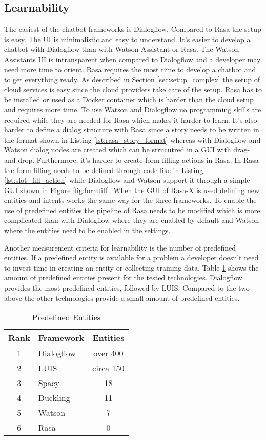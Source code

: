 \subsection*{Learnability}
The easiest of the chatbot frameworks is Dialogflow.
Compared to Rasa the setup is easy.
The UI is minimalistic and easy to understand.
It's easier to develop a chatbot with Dialogflow than with Watson Assistant or Rasa.
The Watson Assistants UI is intransparent when compared to Dialogflow and a developer 
may need more time to orient.
Rasa requires the most time to develop a chatbot and to get everything ready.
As described in Section \ref{sec:setup_complex} the setup of cloud services is 
easy since the cloud providers take care of the setup.
Rasa has to be installed or used as a Docker container which is harder than the cloud 
setup and requires more time.
To use Watson and Dialogflow no programming skills are required while they are needed for 
Rasa which makes it harder to learn.
It's also harder to define a dialog structure with Rasa since a story 
needs to be written in the format shown in Listing \ref{lst:rasa_story_format}
whereas with Dialogflow and Watson dialog nodes are created which 
can be strucutred in a GUI with drag-and-drop.
Furthermore, it's harder to create form filling actions in Rasa.
In Rasa the form filling needs to be defined through code like in Listing \ref{lst:slot_fill_action} while 
Dialogflow and Watson support it through a simple GUI shown in Figure \ref{fig:formfill}.
When the GUI of Rasa-X is used defining new entities and intents works the same way for the three frameworks.
To enable the use of predefined entities the pipeline of Rasa needs to be modified which is more 
complicated than with Dialogflow where they are enabled by default and Watson where the entities need to be 
enabled in the settings.


Another measurement criteria for learnability is the number of predefined entities.
If a predefined entity is available for a problem a developer doesn't need to 
invest time in creating an entity or collecting training data. 
Table \ref{tab:predefined_entities} shows the amount of predefined entities 
present for the tested technologies.
Dialogflow provides the most predefined entities, followed by LUIS.
Compared to the two above the other technologies provide a small amount of predefined entities.
\begin{table}[H]
    \centering
    \begin{tabular}{ c | l | c }
        Rank & Framework &  Entities \\ \hline \hline
        1 & \multirow{1}{*}{Dialogflow} & over 400 \\
        2 & \multirow{1}{*}{LUIS} & circa 150 \\
        3 & \multirow{1}{*}{Spacy} & 18 \\
        4 & \multirow{1}{*}{Duckling} & 11 \\
        5 & \multirow{1}{*}{Watson} & 7  \\
        6 & \multirow{1}{*}{Rasa} & 0 \\
    \end{tabular}
    \caption{Predefined Entities} \label{tab:predefined_entities}
\end{table} \noindent
